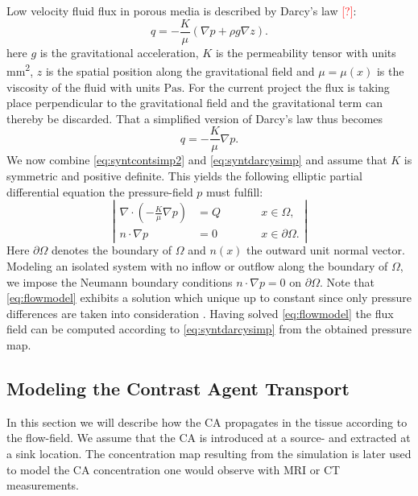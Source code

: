 \documentclass[paper=a4, fontsize=12pt,parskip=half,headings=small]{scrartcl}
\newcommand{\missingsource}{\textcolor{red}{[?]}}
\begin{document}
	Low velocity fluid flux in porous media is described by Darcy's law \missingsource:
	\[
		q = -\frac{K}{\mu} \left( \nabla p + \rho g  \nabla z \right).
	\]
	here $g$ is the gravitational acceleration, $K$ is the permeability tensor with units \si{\square\milli\meter}, $z$ is the spatial position along the gravitational field and $\mu = \mu(x)$ is the viscosity of the fluid with units $\si{\pascal\second}$.
	For the current project the flux is taking place perpendicular to the gravitational field and the gravitational term can thereby be discarded.
	That a simplified version of Darcy's law thus becomes
	\begin{equation}
		q = -\frac{K}{\mu} \nabla p.
		\label{eq:syntdarcysimp}
	\end{equation}
	We now combine \eqref{eq:syntcontsimp2} and \eqref{eq:syntdarcysimp} and assume that $K$ is symmetric and positive definite.
	This yields the following elliptic partial differential equation the pressure-field $p$ must fulfill:
	\begin{equation}
		\left\vert
		\begin{alignedat}{2}
			\nabla \cdot \left( -\frac{K}{\mu} \nabla p \right) &= Q  \qquad &&x \in \Omega, \\
			n \cdot \nabla p &=0 &&x \in \partial \Omega.
		\end{alignedat}
		\right\vert
		\label{eq:flowmodel}
	\end{equation}
	Here $\partial \Omega$ denotes the boundary of $\Omega$ and $n(x)$ the outward unit normal vector. 
	Modeling an isolated system with no inflow or outflow along the boundary of $\Omega$, we impose the Neumann boundary conditions $n \cdot \nabla p = 0$ on $\partial \Omega$.
	Note that \eqref{eq:flowmodel} exhibits a solution which unique up to constant since only pressure differences are taken into consideration \cite{evans98}.
	Having solved \eqref{eq:flowmodel} the flux field can be computed according to \eqref{eq:syntdarcysimp} from the obtained pressure map. 
	
	
	\subsection{Modeling the Contrast Agent Transport}\label{sec:transport}
	In this section we will describe how the CA propagates in the tissue according to the flow-field.
	We assume that the CA is introduced at a source- and extracted at a sink location.
	The concentration map resulting from the simulation is later used to model the CA concentration one would observe with MRI or CT measurements.
	
\end{document}
